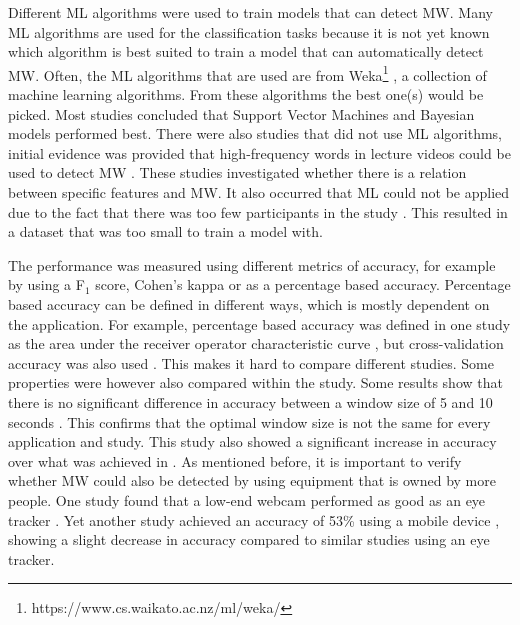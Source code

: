 Different ML algorithms were used to train models that can detect MW. Many ML algorithms are used for the classification tasks because it is not yet known which algorithm is best suited to train a model that can automatically detect MW. Often, the ML algorithms that are used are from Weka\footnote{https://www.cs.waikato.ac.nz/ml/weka/} \cite{Bixler2015AutomaticPhysiology}\cite{Bixler2015AutomaticAwareness}\cite{Bixler2016AutomaticReadingd}\cite{Bixler2014TowardWanderingd}\cite{Blanchard2014AutomatedLearning}\cite{Gwizdka2019ExploringTasks}\cite{Hutt2017OutClassroom}\cite{Pham2015Attentivelearner:Tracking}, a collection of machine learning algorithms. From these algorithms the best one(s) would be picked. Most studies concluded that Support Vector Machines and Bayesian models performed best. There were also studies that did not use ML algorithms, initial evidence was provided that high-frequency words in lecture videos could be used to detect MW \cite{Jo2017AMind}. These studies investigated whether there is a relation between specific features and MW. It also occurred that ML could not be applied due to the fact that there was too few participants in the study \cite{Gontier2016HowEnvironment}. This resulted in a dataset that was too small to train a model with.

The performance was measured using different metrics of accuracy, for example by using a F$_1$ score, Cohen's kappa or as a percentage based accuracy. Percentage based accuracy can be defined in different ways, which is mostly dependent on the application. For example, percentage based accuracy was defined in one study as the area under the receiver operator characteristic curve \cite{Cheetham2016AutomatedApplication}, but cross-validation accuracy was also used \cite{Mishchenko2015DetectingTespiti}. This makes it hard to compare different studies. Some properties were however also compared within the study. Some results show that there is no significant difference in accuracy between a window size of 5 and 10 seconds \cite{Gwizdka2019ExploringTasks}. This confirms that the optimal window size is not the same for every application and study. This study also showed a significant increase in accuracy over what was achieved in \cite{Bixler2014TowardWanderingd}. As mentioned before, it is important to verify whether MW could also be detected by using equipment that is owned by more people. One study found that a low-end webcam performed as good as an eye tracker \cite{Zhao2017ScalableApproach}. Yet another study achieved an accuracy of 53\% using a mobile device \cite{ISI:000443429900018}, showing a slight decrease in accuracy compared to similar studies using an eye tracker.